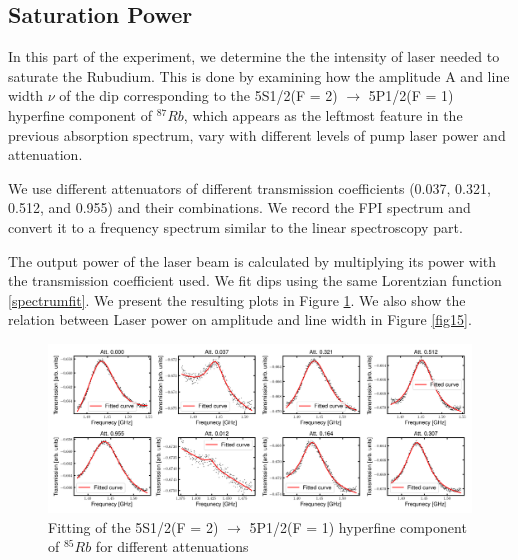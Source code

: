 \documentclass[12pt]{article}
\begin{document}
\subsection{Saturation Power}
In this part of the experiment, we determine the the intensity of laser needed to saturate the Rubudium. This is done by 
examining how the amplitude A and line width $\nu$ of the dip corresponding to the 5S1/2(F = 2) $\xrightarrow{}$  5P1/2(F = 1) hyperfine component of $^{87}Rb$, which appears as the leftmost feature in the previous absorption spectrum, vary with different levels of pump laser power and attenuation.

We use different attenuators of different transmission coefficients (0.037, 0.321, 0.512, and 0.955) and their combinations. We record the FPI spectrum and convert it to a frequency spectrum similar to the linear spectroscopy part.

The output power of the laser beam is calculated by multiplying its power with the transmission coefficient used. We fit dips using the same Lorentzian function \ref{spectrumfit}. We present the resulting plots in Figure \ref{fig14}.  We also show the relation between  Laser power on amplitude and line width in Figure \ref{fig15}.

\begin{figure}[H]
    \centering
    \includegraphics[width = \textwidth]{fig/saturation_fit.png}
    \caption{Fitting of the 5S1/2(F = 2) $\xrightarrow{}$ 5P1/2(F = 1) hyperfine component of $^{85}Rb$ for different attenuations}
    \label{fig14}
\end{figure}
\end{document}
